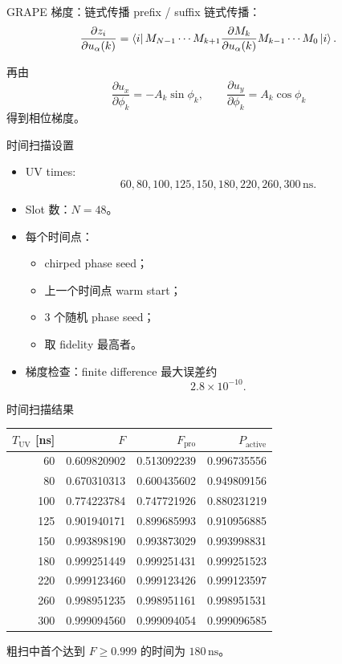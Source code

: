 \documentclass[aspectratio=169,11pt]{ctexbeamer}
\newcommand{\Fpro}{F_{\mathrm{pro}}}
\newcommand{\Pact}{P_{\mathrm{active}}}
\begin{document}
\begin{frame}{GRAPE 梯度：链式传播}
  prefix / suffix 链式传播：
  \[
  \frac{\partial z_i}{\partial u_\alpha(k)}
  =
  \bra{i}
  M_{N-1}\cdots M_{k+1}
  \frac{\partial M_k}{\partial u_\alpha(k)}
  M_{k-1}\cdots M_0
  \ket{i}.
  \]

  再由
  \[
  \frac{\partial u_x}{\partial\phi_k}=-A_k\sin\phi_k,\qquad
  \frac{\partial u_y}{\partial\phi_k}=A_k\cos\phi_k
  \]
  得到相位梯度。
\end{frame}

\begin{frame}{时间扫描设置}
  \begin{itemize}
    \item UV times:
      \[
      60,80,100,125,150,180,220,260,300\,\mathrm{ns}.
      \]
    \item Slot 数：\(N=48\)。
    \item 每个时间点：
      \begin{itemize}
        \item chirped phase seed；
        \item 上一个时间点 warm start；
        \item 3 个随机 phase seed；
        \item 取 fidelity 最高者。
      \end{itemize}
    \item 梯度检查：finite difference 最大误差约
      \[
      2.8\times10^{-10}.
      \]
  \end{itemize}
\end{frame}

\begin{frame}{时间扫描结果}
  \begin{table}
    \centering
    \small
    \begin{tabular}{rrrr}
      \toprule
      \(T_{\mathrm{UV}}\) [ns] & \(F\) & \(\Fpro\) & \(\Pact\) \\
      \midrule
       60 & 0.609820902 & 0.513092239 & 0.996735556 \\
       80 & 0.670310313 & 0.600435602 & 0.949809156 \\
      100 & 0.774223784 & 0.747721926 & 0.880231219 \\
      125 & 0.901940171 & 0.899685993 & 0.910956885 \\
      150 & 0.993898190 & 0.993873029 & 0.993998831 \\
      180 & 0.999251449 & 0.999251431 & 0.999251523 \\
      220 & 0.999123460 & 0.999123426 & 0.999123597 \\
      260 & 0.998951235 & 0.998951161 & 0.998951531 \\
      300 & 0.999094560 & 0.999094054 & 0.999096585 \\
      \bottomrule
    \end{tabular}
  \end{table}

  粗扫中首个达到 \(F\ge0.999\) 的时间为 \(180\,\mathrm{ns}\)。
\end{frame}
\end{document}

